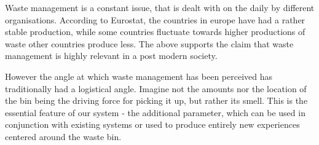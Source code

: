 Waste management is a constant issue, that is dealt with on the daily by different organisations.
According to Eurostat, the countries in europe have had a rather stable production, while some countries fluctuate towards higher productions of waste other countries produce less.
The above supports the claim that waste management is highly relevant in a post modern society.

However the angle at which waste management has been perceived has traditionally had a logistical angle.
Imagine not the amounts nor the location of the bin being the driving force for picking it up, but rather its smell.
This is the essential feature of our system - the additional parameter, which can be used in conjunction with existing systems or used to produce entirely new experiences centered around the waste bin.